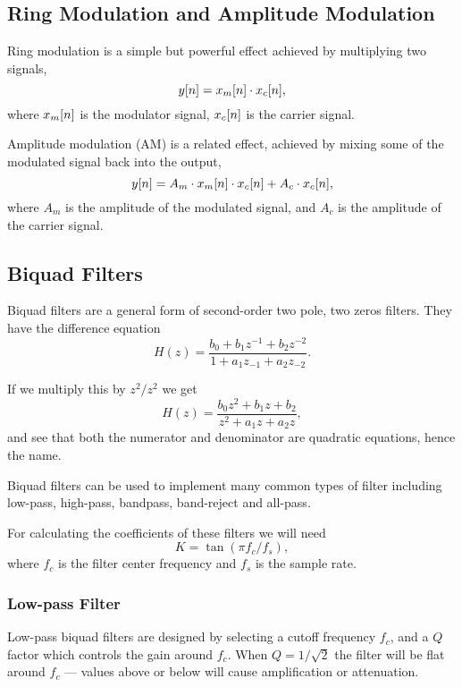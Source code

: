 \documentclass[11pt]{article}
\let\originalleft\left
\let\originalright\right
\renewcommand{\left}{\mathopen{}\mathclose\bgroup\originalleft}
\renewcommand{\right}{\aftergroup\egroup\originalright}
\def\lsqb{\left[}
\def\rsqb{\right]}
\def\sqb#1{\lsqb #1 \rsqb}
\def\ysig{y\sqb{n}}
\begin{document}
\subsection{Ring Modulation and Amplitude Modulation}
Ring modulation is a simple but powerful effect achieved by multiplying two signals,
\begin{equation}
	\ysig = x_m\sqb{n} \cdot x_c\sqb{n},
\end{equation}
where $x_m\sqb{n}$ is the modulator signal, $x_c\sqb{n}$ is the carrier signal. 

Amplitude modulation (AM) is a related effect, achieved by mixing some of the modulated signal back into the output,
\begin{equation}
	\ysig = A_m \cdot x_m\sqb{n} \cdot x_c\sqb{n} + A_c \cdot x_c\sqb{n},
\end{equation}
where $A_m$ is the amplitude of the modulated signal, and $A_c$ is the amplitude of the carrier signal.

\subsection{Biquad Filters}
Biquad filters are a general form of second-order two pole, two zeros filters. They have the difference equation
\begin{equation}
    H(z) = \frac{b_0 + b_1 z^{-1} + b_2 z ^{-2}}{1 + a_1 z_{-1} + a_2 z_{-2}}.
\end{equation}

If we multiply this by $z^2 / z^2$ we get 
\begin{equation}
    H(z) = \frac{b_0 z^2 + b_1 z + b_2}{z^2 + a_1 z + a_2 z},
\end{equation}
and see that both the numerator and denominator are quadratic equations, hence the name.

Biquad filters can be used to implement many common types of filter including low-pass, high-pass, bandpass, band-reject and all-pass.

For calculating the coefficients of these filters we will need
\begin{equation}
    K = \tan (\pi f_c / f_s),
\end{equation}
where $f_c$ is the filter center frequency and $f_s$ is the sample rate.

\subsubsection{Low-pass Filter}
Low-pass biquad filters are designed by selecting a cutoff frequency $f_c$, and a $Q$ factor which controls the gain around $f_c$.
When $Q = 1/\sqrt 2$ the filter will be flat around $f_c$ --- values above or below will cause amplification or attenuation.
\end{document}
